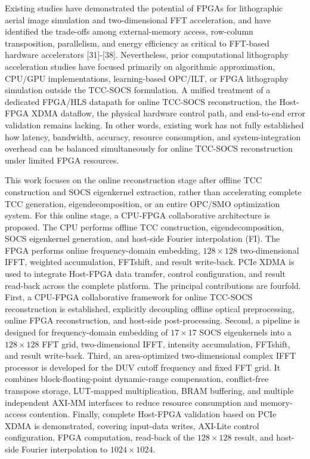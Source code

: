 \documentclass[
  preprint]{elsarticle}
\begin{document}
Existing studies have demonstrated the potential of FPGAs for
lithographic aerial image simulation and two-dimensional FFT
acceleration, and have identified the trade-offs among external-memory
access, row-column transposition, parallelism, and energy efficiency as
critical to FFT-based hardware accelerators {[}31{]}-{[}38{]}.
Nevertheless, prior computational lithography acceleration studies have
focused primarily on algorithmic approximation, CPU/GPU implementations,
learning-based OPC/ILT, or FPGA lithography simulation outside the
TCC-SOCS formulation. A unified treatment of a dedicated FPGA/HLS
datapath for online TCC-SOCS reconstruction, the Host-FPGA XDMA
dataflow, the physical hardware control path, and end-to-end error
validation remains lacking. In other words, existing work has not fully
established how latency, bandwidth, accuracy, resource consumption, and
system-integration overhead can be balanced simultaneously for online
TCC-SOCS reconstruction under limited FPGA resources.

This work focuses on the online reconstruction stage after offline TCC
construction and SOCS eigenkernel extraction, rather than accelerating
complete TCC generation, eigendecomposition, or an entire OPC/SMO
optimization system. For this online stage, a CPU-FPGA collaborative
architecture is proposed. The CPU performs offline TCC construction,
eigendecomposition, SOCS eigenkernel generation, and host-side Fourier
interpolation (FI). The FPGA performs online frequency-domain embedding,
\(128 \times 128\) two-dimensional IFFT, weighted accumulation,
FFTshift, and result write-back. PCIe XDMA is used to integrate
Host-FPGA data transfer, control configuration, and result read-back
across the complete platform. The principal contributions are fourfold.
First, a CPU-FPGA collaborative framework for online TCC-SOCS
reconstruction is established, explicitly decoupling offline optical
preprocessing, online FPGA reconstruction, and host-side
post-processing. Second, a pipeline is designed for frequency-domain
embedding of \(17 \times 17\) SOCS eigenkernels into a
\(128 \times 128\) FFT grid, two-dimensional IFFT, intensity
accumulation, FFTshift, and result write-back. Third, an area-optimized
two-dimensional complex IFFT processor is developed for the DUV cutoff
frequency and fixed FFT grid. It combines block-floating-point
dynamic-range compensation, conflict-free transpose storage, LUT-mapped
multiplication, BRAM buffering, and multiple independent AXI-MM
interfaces to reduce resource consumption and memory-access contention.
Finally, complete Host-FPGA validation based on PCIe XDMA is
demonstrated, covering input-data writes, AXI-Lite control
configuration, FPGA computation, read-back of the \(128 \times 128\)
result, and host-side Fourier interpolation to \(1024 \times 1024\).
\end{document}

